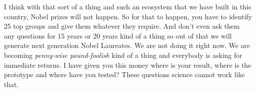 \begin{multicols}{2}
I think with that sort of a thing and such an ecosystem that we have built in this country, Nobel prizes will not happen. So for that to happen, you have to identify 25 top groups and give them whatever they require. And don’t even ask them any questions for 15 years or 20 years kind of a thing so out of that we will generate next generation Nobel Laureates. We are not doing it right now. We are becoming \textit{penny-wise pound-foolish} kind of a thing and everybody is asking for immediate returns. I have given you this money where is your result, where is the prototype and where have you tested? These questions science cannot work like that.\hfill {}
\end{multicols}
